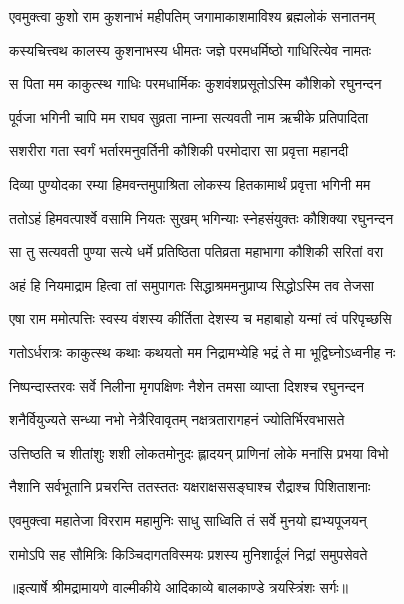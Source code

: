 \twolineshloka
{एवमुक्त्वा कुशो राम कुशनाभं महीपतिम्}
{जगामाकाशमाविश्य ब्रह्मलोकं सनातनम्} %

\twolineshloka
{कस्यचित्त्वथ कालस्य कुशनाभस्य धीमतः}
{जज्ञे परमधर्मिष्ठो गाधिरित्येव नामतः} %

\twolineshloka
{स पिता मम काकुत्स्थ गाधिः परमधार्मिकः}
{कुशवंशप्रसूतोऽस्मि कौशिको रघुनन्दन} %

\twolineshloka
{पूर्वजा भगिनी चापि मम राघव सुव्रता}
{नाम्ना सत्यवती नाम ऋचीके प्रतिपादिता} %

\twolineshloka
{सशरीरा गता स्वर्गं भर्तारमनुवर्तिनी}
{कौशिकी परमोदारा सा प्रवृत्ता महानदी} %

\twolineshloka
{दिव्या पुण्योदका रम्या हिमवन्तमुपाश्रिता}
{लोकस्य हितकामार्थं प्रवृत्ता भगिनी मम} %

\twolineshloka
{ततोऽहं हिमवत्पार्श्वे वसामि नियतः सुखम्}
{भगिन्याः स्नेहसंयुक्तः कौशिक्या रघुनन्दन} %

\twolineshloka
{सा तु सत्यवती पुण्या सत्ये धर्मे प्रतिष्ठिता}
{पतिव्रता महाभागा कौशिकी सरितां वरा} %

\twolineshloka
{अहं हि नियमाद्राम हित्वा तां समुपागतः}
{सिद्धाश्रममनुप्राप्य सिद्धोऽस्मि तव तेजसा} %

\twolineshloka
{एषा राम ममोत्पत्तिः स्वस्य वंशस्य कीर्तिता}
{देशस्य च महाबाहो यन्मां त्वं परिपृच्छसि} %

\twolineshloka
{गतोऽर्धरात्रः काकुत्स्थ कथाः कथयतो मम}
{निद्रामभ्येहि भद्रं ते मा भूद्विघ्नोऽध्वनीह नः} %

\twolineshloka
{निष्पन्दास्तरवः सर्वे निलीना मृगपक्षिणः}
{नैशेन तमसा व्याप्ता दिशश्च रघुनन्दन} %

\twolineshloka
{शनैर्वियुज्यते सन्ध्या नभो नेत्रैरिवावृतम्}
{नक्षत्रतारागहनं ज्योतिर्भिरवभासते} %

\twolineshloka
{उत्तिष्ठति च शीतांशुः शशी लोकतमोनुदः}
{ह्लादयन् प्राणिनां लोके मनांसि प्रभया विभो} %

\twolineshloka
{नैशानि सर्वभूतानि प्रचरन्ति ततस्ततः}
{यक्षराक्षससङ्घाश्च रौद्राश्च पिशिताशनाः} %

\twolineshloka
{एवमुक्त्वा महातेजा विरराम महामुनिः}
{साधु साध्विति तं सर्वे मुनयो ह्यभ्यपूजयन्} %

\twolineshloka
{रामोऽपि सह सौमित्रिः किञ्चिदागतविस्मयः}
{प्रशस्य मुनिशार्दूलं निद्रां समुपसेवते} %


{॥इत्यार्षे श्रीमद्रामायणे वाल्मीकीये आदिकाव्ये बालकाण्डे त्रयस्त्रिंशः सर्गः॥}

